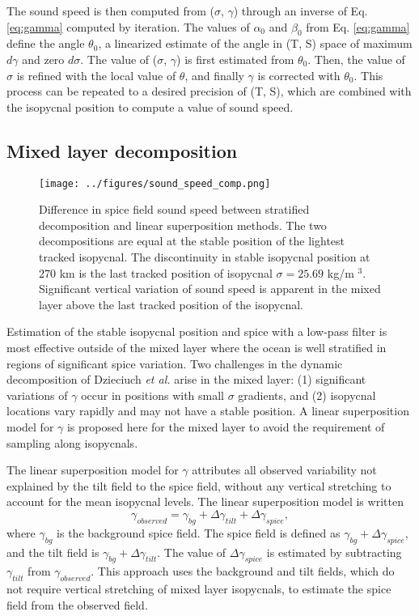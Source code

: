 \documentclass[preprint,NumberedRefs]{JASA}
\begin{document}
The sound speed is then computed from ($\sigma$, $\gamma$) through an inverse of Eq. \eqref{eq:gamma} computed by iteration. The values of $\alpha_0$ and $\beta_0$ from Eq. \eqref{eq:gamma} define the angle $\theta_0$, a linearized estimate of the angle in (T, S) space of maximum $d\gamma$ and zero $d\sigma$. The value of ($\sigma$, $\gamma$) is first estimated from $\theta_0$. Then, the value of $\sigma$ is refined with the local value of $\theta$, and finally $\gamma$ is corrected with $\theta_0$. This process can be repeated to a desired precision of (T, S), which are combined with the isopycnal position to compute a value of sound speed.

\subsection{Mixed layer decomposition}
\begin{figure}
\texttt{[image: ../figures/sound\_speed\_comp.png]}
    \caption{\label{fig:c_diff}{Difference in spice field sound speed between stratified decomposition and linear superposition methods. The two decompositions are equal at the stable position of the lightest tracked isopycnal. The discontinuity in stable isopycnal position at 270 km is the last tracked position of isopycnal $\sigma=25.69$ kg/m $^3$. Significant vertical variation of sound speed is apparent in the mixed layer above the last tracked position of the isopycnal.}}
\end{figure}

Estimation of the stable isopycnal position and spice with a low-pass filter is most effective outside of the mixed layer where the ocean is well stratified in regions of significant spice variation. Two challenges in the dynamic decomposition of Dzieciuch \emph{et al.}\citep{dzieciuch2004} arise in the mixed layer: (1) significant variations of $\gamma$ occur in positions with small $\sigma$ gradients, and (2) isopycnal locations vary rapidly and may not have a stable position. A linear superposition model for $\gamma$ is proposed here for the mixed layer to avoid the requirement of sampling along isopycnals.

The linear superposition model for $\gamma$ attributes all observed variability not explained by the tilt field to the spice field, without any vertical stretching to account for the mean isopycnal levels. The linear superposition model is written
\begin{equation}
    \gamma_{observed} = \gamma_{bg} + \Delta \gamma_{tilt} + \Delta \gamma_{spice},
    \label{eq:lin_sup}
\end{equation}
where $\gamma_{bg}$ is the background spice field. The spice field is defined as $\gamma_{bg} + \Delta \gamma_{spice}$, and the tilt field is $\gamma_{bg} + \Delta \gamma_{tilt}$. The value of $\Delta \gamma_{spice}$ is estimated by subtracting $\gamma_{tilt}$ from $\gamma_{observed}$. This approach uses the background and tilt fields, which do not require vertical stretching of mixed layer isopycnals, to estimate the spice field from the observed field.
\end{document}
